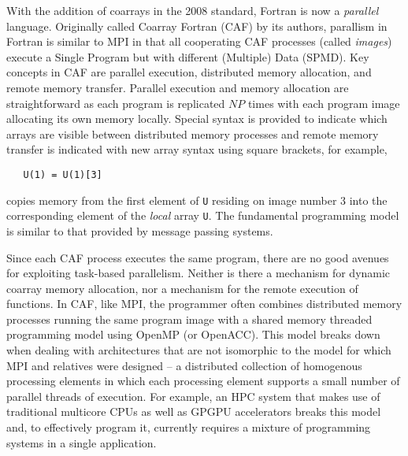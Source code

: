 
With the addition of coarrays in the 2008 standard, Fortran is now a \emph{parallel}
language.  Originally called Coarray Fortran (CAF) by its
authors\cite{Numrich:1998:CFP:289918.289920}, parallism in Fortran is similar to MPI in
that all cooperating CAF processes (called \emph{images}) execute a Single Program but with
different (Multiple) Data (SPMD).  Key concepts in CAF are parallel execution, distributed
memory allocation, and remote memory transfer.  Parallel execution and memory allocation
are straightforward as each program is replicated $NP$ times with each program image
allocating its own memory locally.  Special syntax is provided to indicate which arrays
are visible between distributed memory processes and remote memory transfer is indicated
with new array syntax using square brackets, for example,
\small
\begin{verbatim}
   U(1) = U(1)[3]
\end{verbatim}
\normalsize
copies memory from the first element of \texttt{U} residing on image number 3 into
the corresponding element of the \emph{local} array \texttt{U}.  The fundamental programming
model is similar to that provided by message passing systems.

Since each CAF process executes the same program, there are no good avenues for exploiting
task-based parallelism.  Neither is there a mechanism for dynamic coarray memory
allocation, nor a mechanism for the remote execution of functions.  In CAF, like MPI, the
programmer often combines distributed memory processes running the same program image with a
shared memory threaded programming model using OpenMP (or OpenACC).  This model breaks down
when dealing with architectures that are not isomorphic to the model for which MPI and
relatives were designed -- a distributed collection of homogenous processing elements in
which each processing element supports a small number of parallel threads of execution.  For
example, an HPC system that makes use of traditional multicore CPUs as well as GPGPU accelerators
breaks this model and, to effectively program it, currently requires a mixture of programming
systems in a single application.

